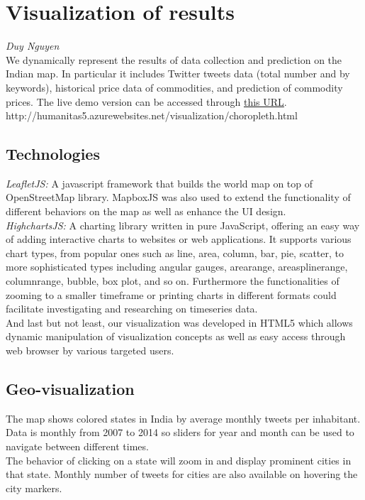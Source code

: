 \section*{Visualization of results}\emph{Duy Nguyen}
\\
We dynamically represent the results of data collection and prediction on the Indian map. In particular it includes Twitter tweets data (total number and by keywords), historical price data of commodities, and prediction of commodity prices. The live demo version can be accessed through \href{http://humanitas5.azurewebsites.net/visualization/choropleth.html}{this URL}.\\
http://humanitas5.azurewebsites.net/visualization/choropleth.html

\subsection*{Technologies}
\emph{LeafletJS:} A javascript framework that builds the world map on top of OpenStreetMap library. MapboxJS was also used to extend the functionality of different behaviors on the map as well as enhance the UI design.\\
\emph{HighchartsJS:} A charting library written in pure JavaScript, offering an easy way of adding interactive charts to websites or web applications. It supports various chart types, from popular ones such as line, area, column, bar, pie, scatter, to more sophisticated types including angular gauges, arearange, areasplinerange, columnrange, bubble, box plot, and so on. Furthermore the functionalities of zooming to a smaller timeframe or printing charts in different formats could facilitate investigating and researching on timeseries data.\\
And last but not least, our visualization was developed in HTML5 which allows dynamic manipulation of visualization concepts as well as easy access through web browser by various targeted users.

\subsection*{Geo-visualization}
The map shows colored states in India by average monthly tweets per inhabitant. Data is monthly from 2007 to 2014 so sliders for year and month can be used to navigate between different times.\\
The behavior of clicking on a state will zoom in and display prominent cities in that state. Monthly number of tweets for cities are also available on hovering the city markers.


